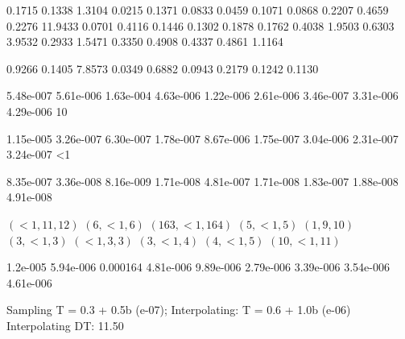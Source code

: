     0.1715    0.1338    1.3104    0.0215    0.1371    0.0833    0.0459    0.1071    0.0868    0.2207
    0.4659    0.2276   11.9433    0.0701    0.4116    0.1446    0.1302    0.1878    0.1762    0.4038
    1.9503    0.6303    3.9532    0.2933    1.5471    0.3350    0.4908    0.4337    0.4861    1.1164

    0.9266    0.1405    7.8573    0.0349    0.6882    0.0943    0.2179    0.1242    0.1130

5.48e-007   5.61e-006   1.63e-004   4.63e-006   1.22e-006   2.61e-006   3.46e-007   3.31e-006   4.29e-006      10

1.15e-005   3.26e-007   6.30e-007   1.78e-007   8.67e-006   1.75e-007   3.04e-006   2.31e-007   3.24e-007       <1

8.35e-007   3.36e-008   8.16e-009   1.71e-008   4.81e-007   1.71e-008   1.83e-007   1.88e-008   4.91e-008


$(<1, 11, 12)$ $(6, <1, 6)$ $(163, <1, 164)$  $(5, <1, 5)$ $(1, 9, 10)$ $(3, <1, 3)$ $(<1, 3, 3)$ $(3, <1, 4)$ $(4, <1, 5)$ $(10, <1, 11)$


1.2e-005
5.94e-006
 0.000164
4.81e-006
9.89e-006
2.79e-006
3.39e-006
3.54e-006
4.61e-006

Sampling T = 0.3 + 0.5b (e-07);
Interpolating: T = 0.6 + 1.0b (e-06)
Interpolating DT: 11.50 











